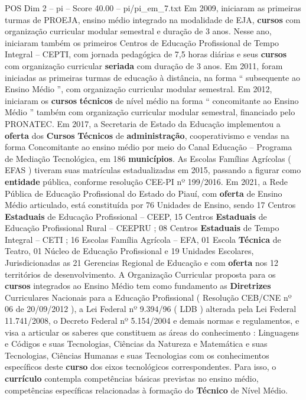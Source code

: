 \begin{textsample}{POS Dim 2 – pi – Score 40.00 – pi/pi\_em\_7.txt}
Em 2009, iniciaram as primeiras turmas de PROEJA, ensino médio integrado na modalidade de EJA, \textbf{cursos} com organização curricular modular semestral e duração de 3 anos.
Nesse ano, iniciaram também os primeiros Centros de Educação Profissional de Tempo Integral – CEPTI, com jornada pedagógica de 7,5 horas diárias e seus \textbf{cursos} com organização curricular \textbf{seriada} com duração de 3 anos.
Em 2011, foram iniciadas as primeiras turmas de educação à distância, na forma “ subsequente ao Ensino Médio ”, com organização curricular modular semestral.
Em 2012, iniciaram os \textbf{cursos} \textbf{técnicos} de nível médio na forma “ concomitante ao Ensino Médio ” também com organização curricular modular semestral, financiado pelo PRONATEC.
Em 2017, a Secretaria de Estado da Educação implementou a \textbf{oferta} dos \textbf{Cursos} \textbf{Técnicos} de \textbf{administração}, cooperativismo e vendas na forma Concomitante ao ensino médio por meio do Canal Educação – Programa de Mediação Tecnológica, em 186 \textbf{municípios}.
As Escolas Famílias Agrícolas ( EFAS ) tiveram suas matrículas estadualizadas em 2015, passando a figurar como \textbf{entidade} pública, conforme resolução CEE-PI nº 199/2016.
Em 2021, a Rede Pública de Educação Profissional do Estado do Piauí, com \textbf{oferta} de Ensino Médio articulado, está constituída por 76 Unidades de Ensino, sendo 17 Centros \textbf{Estaduais} de Educação Profissional – CEEP, 15 Centros \textbf{Estaduais} de Educação Profissional Rural – CEEPRU ; 08 Centros \textbf{Estaduais} de Tempo Integral – CETI ; 16 Escolas Família Agrícola – EFA, 01 Escola \textbf{Técnica} de Teatro, 01 Núcleo de Educação Profissional e 19 Unidades Escolares, Jurisdicionadas as 21 Gerencias Regional de Educação e com \textbf{oferta} nos 12 territórios de desenvolvimento.
A Organização Curricular proposta para os \textbf{cursos} integrados ao Ensino Médio tem como fundamento as \textbf{Diretrizes} Curriculares Nacionais para a Educação Profissional ( Resolução CEB/CNE nº 06 de 20/09/2012 ), a Lei Federal nº 9.394/96 ( LDB ) alterada pela Lei Federal 11.741/2008, o Decreto Federal nº 5.154/2004 e demais normas e regulamentos, e visa a articular os saberes que constituem as áreas do conhecimento : Linguagens e Códigos e suas Tecnologias, Ciências da Natureza e Matemática e suas Tecnologias, Ciências Humanas e suas Tecnologias com os conhecimentos específicos deste \textbf{curso} dos eixos tecnológicos correspondentes.
Para isso, o \textbf{currículo} contempla competências básicas previstas no ensino médio, competências específicas relacionadas à formação do \textbf{Técnico} de Nível Médio.

\end{textsample}
